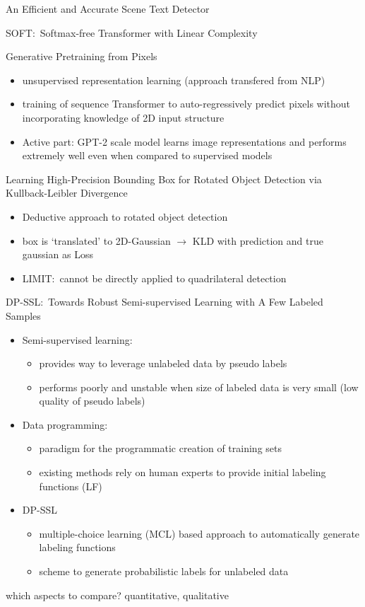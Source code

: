 An Efficient and Accurate Scene Text Detector~\citep{zhou_east_2017}

SOFT:\ Softmax-free Transformer with Linear Complexity~\citep{lu_soft_2021}

Generative Pretraining from Pixels~\citep{chen_generative_2021}
\begin{itemize}
    \item unsupervised representation learning (approach transfered from NLP)
    \item training of sequence Transformer to auto-regressively predict pixels without incorporating
        knowledge of 2D input structure
    \item Active part: GPT-2 scale model learns image representations and performs extremely well even
        when compared to supervised models
\end{itemize}

Learning High-Precision Bounding Box for Rotated Object Detection via Kullback-Leibler
Divergence~\citep{yang_learning_2021}
\begin{itemize}
    \item Deductive approach to rotated object detection
    \item box is `translated' to 2D-Gaussian $\rightarrow$ KLD with prediction and true gaussian as Loss
    \item LIMIT:\ cannot be directly applied to quadrilateral detection
\end{itemize}

DP-SSL:\ Towards Robust Semi-supervised Learning with A Few Labeled Samples~\citep{xu_dp-ssl_2021}
\begin{itemize}
    \item Semi-supervised learning:
        \begin{itemize}
            \item provides way to leverage unlabeled data by pseudo labels
            \item performs poorly and unstable when size of labeled data is very small (low quality
                of pseudo labels)
        \end{itemize}
    \item Data programming:
        \begin{itemize}
            \item paradigm for the programmatic creation of training sets
            \item existing methods rely on human experts to provide initial labeling functions (LF)
        \end{itemize}
    \item DP-SSL
        \begin{itemize}
            \item multiple-choice learning (MCL) based approach to automatically generate labeling functions
            \item scheme to generate probabilistic labels for unlabeled data
        \end{itemize}
\end{itemize}

which aspects to compare? quantitative, qualitative
